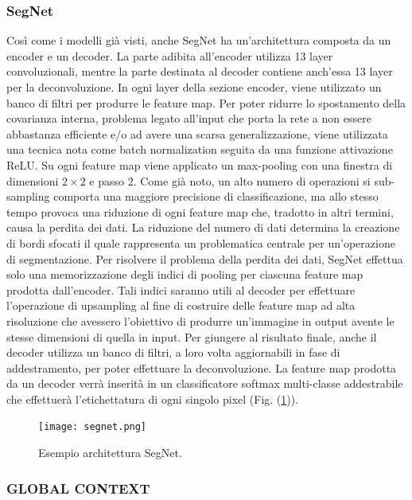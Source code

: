 \subsubsection{SegNet}
Così come i modelli già visti, anche SegNet ha un'architettura composta da un 
encoder e un decoder. La parte adibita all'encoder utilizza 13 layer convoluzionali, 
mentre la parte destinata al decoder contiene anch'essa 13 layer per la deconvoluzione. 
In ogni layer della sezione encoder, viene utilizzato un banco di filtri 
per produrre le feature map. Per poter ridurre lo spostamento della covarianza 
interna, problema legato all'input che porta la rete a non essere abbastanza 
efficiente e/o ad avere una scarsa generalizzazione, viene utilizzata una tecnica 
nota come batch normalization \cite{batchNorm} seguita da una funzione attivazione ReLU. Su 
ogni feature map viene applicato un max-pooling con una finestra di dimensioni 
$2\times 2$ e passo 2. Come già noto, un alto numero di operazioni si sub-sampling 
comporta una maggiore precisione di classificazione, ma allo stesso tempo provoca 
una riduzione di ogni feature map che, tradotto in altri termini, causa la perdita 
dei dati. La riduzione del numero di dati determina la creazione di bordi sfocati 
il quale rappresenta un problematica centrale per un'operazione di segmentazione. 
Per risolvere il problema della perdita dei dati, SegNet effettua solo una memorizzazione 
degli indici di pooling per ciascuna feature map prodotta dall'encoder. 
Tali indici saranno utili al decoder per effettuare l'operazione di upsampling 
al fine di costruire delle feature map ad alta risoluzione che avessero l'obiettivo di 
produrre un'immagine in output avente le stesse dimensioni di quella in input. 
Per giungere al risultato finale, anche il decoder utilizza un banco di filtri, a loro 
volta aggiornabili in fase di addestramento, per poter effettuare la deconvoluzione. 
La feature map prodotta da un decoder verrà inserità in un classificatore softmax 
multi-classe addestrabile che effettuerà l'etichettatura di ogni singolo pixel (Fig. (\ref{segnet})).
\begin{figure}
    \centering
    \texttt{[image: segnet.png]}
    \centering
    \caption{Esempio architettura SegNet.}
    \label{segnet}
\end{figure}

\subsubsection{GLOBAL CONTEXT}
